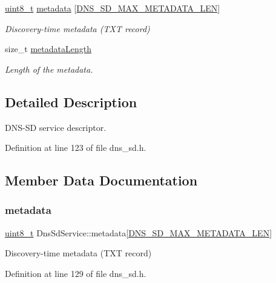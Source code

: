 \begin{DoxyCompactItemize}
\hyperlink{stdint_8h_aba7bc1797add20fe3efdf37ced1182c5}{uint8\+\_\+t} \hyperlink{structDnsSdService_acdddadde600948cb3f18ac8b50aa6faa}{metadata} \mbox{[}\hyperlink{dns__sd_8h_ab5fb0408ad9338aa081959533e30bd0b}{D\+N\+S\+\_\+\+S\+D\+\_\+\+M\+A\+X\+\_\+\+M\+E\+T\+A\+D\+A\+T\+A\+\_\+\+L\+EN}\mbox{]}
\begin{DoxyCompactList}\small\item\em Discovery-\/time metadata (T\+XT record) \end{DoxyCompactList}\item 
size\+\_\+t \hyperlink{structDnsSdService_a09d63607034e43aa05f059e1e0ba3e81}{metadata\+Length}
\begin{DoxyCompactList}\small\item\em Length of the metadata. \end{DoxyCompactList}\end{DoxyCompactItemize}


\subsection{Detailed Description}
D\+N\+S-\/\+SD service descriptor. 

Definition at line 123 of file dns\+\_\+sd.\+h.



\subsection{Member Data Documentation}
\mbox{\label{structDnsSdService_acdddadde600948cb3f18ac8b50aa6faa}} 
\subsubsection{\texorpdfstring{metadata}{metadata}}
{\footnotesize\ttfamily \hyperlink{stdint_8h_aba7bc1797add20fe3efdf37ced1182c5}{uint8\+\_\+t} Dns\+Sd\+Service\+::metadata\mbox{[}\hyperlink{dns__sd_8h_ab5fb0408ad9338aa081959533e30bd0b}{D\+N\+S\+\_\+\+S\+D\+\_\+\+M\+A\+X\+\_\+\+M\+E\+T\+A\+D\+A\+T\+A\+\_\+\+L\+EN}\mbox{]}}



Discovery-\/time metadata (T\+XT record) 



Definition at line 129 of file dns\+\_\+sd.\+h.

